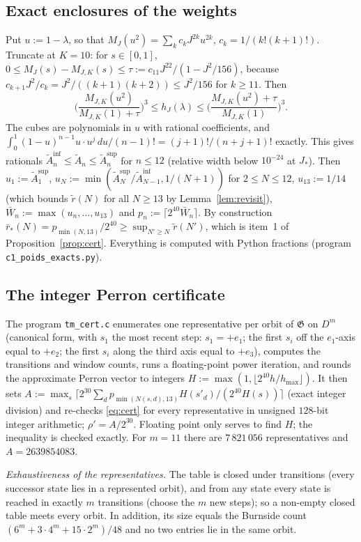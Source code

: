\documentclass[11pt,a4paper]{article}
\theoremstyle{plain}
\theoremstyle{remark}
\numberwithin{equation}{section}
\newcommand{\At}{\widetilde A}
\newcommand{\rt}{\widetilde r}
\newcommand{\rb}{\bar r}
\begin{document}
\subsection{Exact enclosures of the weights}\label{sec:weights}
Put $u:=1-\lambda$, so that $M_J(u^2)=\sum_kc_kJ^{2k}u^{2k}$, $c_k=1/(k!(k+1)!)$. Truncate at $K=10$: for $s\in[0,1]$,
$0\le M_J(s)-M_{J,K}(s)\le\tau:=c_{11}J^{22}/(1-J^2/156)$, because $c_{k+1}J^2/c_k=J^2/((k+1)(k+2))\le J^2/156$ for $k\ge11$. Then
\[
\Big(\frac{M_{J,K}(u^2)}{M_{J,K}(1)+\tau}\Big)^3\le h_J(\lambda)\le\Big(\frac{M_{J,K}(u^2)+\tau}{M_{J,K}(1)}\Big)^3 .
\]
The cubes are polynomials in $u$ with rational coefficients, and $\int_0^1(1-u)^{n-1}u\cdot u^j\,du/(n-1)!=(j+1)!/(n+j+1)!$ exactly.
This gives rationals $\At_n^{\inf}\le\At_n\le\At_n^{\sup}$ for $n\le12$ (relative width below $10^{-24}$ at $J_*$). Then
$u_1:=\At_1^{\sup}$, $u_N:=\min(\At_N^{\sup}/\At_{N-1}^{\inf},1/(N+1))$ for $2\le N\le12$, $u_{13}:=1/14$ (which bounds $\rt(N)$ for all
$N\ge13$ by Lemma~\ref{lem:revisit}), $\bar W_n:=\max(u_n,\dots,u_{13})$ and $p_n:=\lceil2^{40}\bar W_n\rceil$. By construction
$\rb_*(N)=p_{\min(N,13)}/2^{40}\ge\sup_{N'\ge N}\rt(N')$, which is item~1 of Proposition~\ref{prop:cert}. Everything is computed with
Python fractions (program \texttt{c1\_poids\_exacts.py}).

\subsection{The integer Perron certificate}\label{sec:perron}
The program \texttt{tm\_cert.c} enumerates one representative per orbit of $\mathfrak G$ on $D^m$ (canonical form, with $s_1$ the most recent step: $s_1=+e_1$;
the first $s_i$ off the $e_1$-axis equal to $+e_2$; the first $s_i$ along the third axis equal to $+e_3$), computes the transitions and window
counts, runs a floating-point power iteration, and rounds the approximate Perron vector to integers $H:=\max(1,\lfloor2^{40}h/
h_{\max}\rfloor)$. It then sets $A:=\max_s\lceil2^{30}\sum_dp_{\min(N(s,d),13)}H(s'_d)/(2^{40}H(s))\rceil$ (exact integer division) and
re-checks \eqref{eq:cert} for every representative in unsigned $128$-bit integer arithmetic; $\rho'=A/2^{30}$. Floating point only
serves to find $H$; the inequality is checked exactly. For $m=11$ there are $7\,821\,056$ representatives and $A=2639854083$.

\emph{Exhaustiveness of the representatives.} The table is closed under transitions (every successor state lies in a represented
orbit), and from any state every state is reached in exactly $m$ transitions (choose the $m$ new steps); so a non-empty closed table
meets every orbit. In addition, its size equals the Burnside count $(6^m+3\cdot4^m+15\cdot2^m)/48$ and no two entries lie in the same
orbit.
\end{document}
